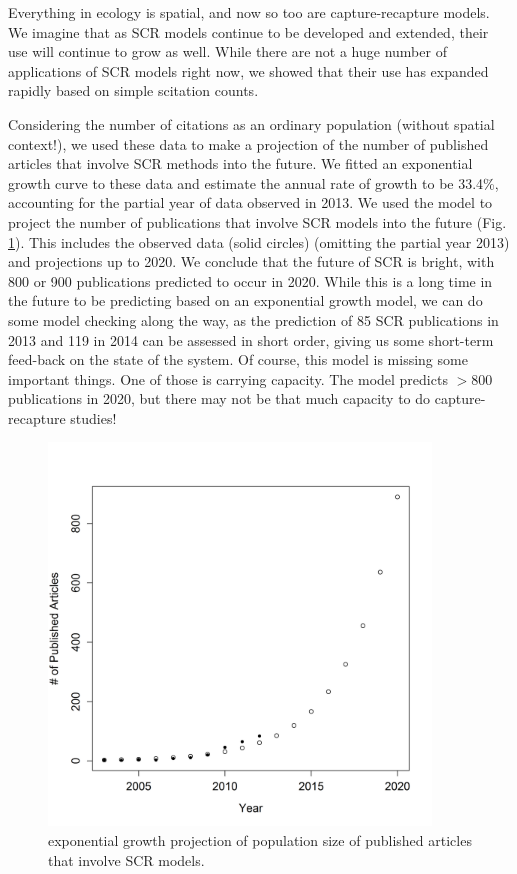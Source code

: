 \begin{table}[ht]
Everything in ecology is spatial, and now so too are capture-recapture
models. We imagine that as SCR models continue to be developed and
extended, their use will continue to grow as well. While there are not
a huge number of applications of SCR models right now, we showed that
their use has expanded rapidly based on simple scitation counts. 

Considering the number of citations as an ordinary population (without
spatial context!), we used these data to make a projection of the
number of published articles that involve SCR methods into the future.
We fitted an exponential growth curve to these data and estimate the
annual rate of growth to be 33.4\%, accounting for the partial year of
data observed in 2013.
We used the model to project the number of
publications that involve SCR models into the future
(Fig. \ref{last.fig.expgrowth}). This includes the observed data
(solid circles) (omitting the partial year 2013) and projections up to
2020.  We conclude that the future of SCR is bright, with 800 or 900
publications predicted to occur in 2020. While this is a long time in
the future to be predicting based on an exponential growth model, we
can do some model checking along the way, as the prediction of 85 SCR
publications in 2013 and 119 in 2014 can be assessed in short order,
giving us some short-term feed-back on the state of the system.  Of
course, this model is missing some important things. One of those is
carrying capacity. The model predicts $>800$ publications in 2020, but
there may not be that much capacity to do capture-recapture studies!


\begin{figure}[ht]
\centering
\includegraphics[width=4in,height=4in]{Ch20-Last/exp_growth.png}
\caption{
exponential growth projection of population size of published articles
that involve SCR models.
}
\label{last.fig.expgrowth}
\end{figure}











\end{table}
